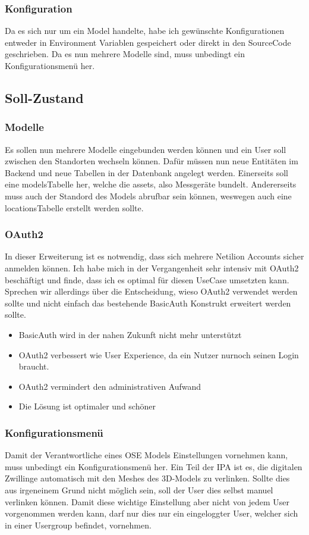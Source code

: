 \subsubsection{Konfiguration}
Da es sich nur um ein Model handelte, habe ich gewünschte Konfigurationen entweder in Environment Variablen gespeichert oder direkt in den SourceCode geschrieben. Da es nun mehrere Modelle sind, muss unbedingt ein Konfigurationsmenü her.
\subsection{Soll-Zustand} \label{soll-zustand}
\subsubsection{Modelle}
Es sollen nun mehrere Modelle eingebunden werden können und ein User soll zwischen den Standorten wechseln können. Dafür müssen nun neue Entitäten im Backend und neue Tabellen in der Datenbank angelegt werden. Einerseits soll eine \flqq models\frqq Tabelle her, welche die \flqq assets\frqq , also Messgeräte bundelt. Andererseits muss auch der Standord des Models abrufbar sein können, weswegen auch eine \flqq locations\frqq Tabelle erstellt werden sollte.
\subsubsection{OAuth2}
In dieser Erweiterung ist es notwendig, dass sich mehrere Netilion Accounts sicher anmelden können. Ich habe mich in der Vergangenheit sehr intensiv mit OAuth2 beschäftigt und finde, dass ich es optimal für diesen UseCase umsetzten kann. Sprechen wir allerdings über die Entscheidung, wieso OAuth2 verwendet werden sollte und nicht einfach das bestehende BasicAuth Konstrukt erweitert werden sollte.
\begin{itemize}
  \item BasicAuth wird in der nahen Zukunft nicht mehr unterstützt
  \item OAuth2 verbessert wie User Experience, da ein Nutzer nurnoch seinen Login braucht.
  \item OAuth2 vermindert den administrativen Aufwand
  \item Die Lösung ist optimaler und schöner
\end{itemize}
\subsubsection{Konfigurationsmenü}
Damit der Verantwortliche eines OSE Models Einstellungen vornehmen kann, muss unbedingt ein Konfigurationsmenü her. Ein Teil der IPA ist es, die digitalen Zwillinge automatisch mit den Meshes des 3D-Models zu verlinken. Sollte dies aus irgeneinem Grund nicht möglich sein, soll der User dies selbst manuel verlinken können. Damit diese wichtige Einstellung aber nicht von jedem User vorgenommen werden kann, darf nur dies nur ein eingeloggter User, welcher sich in einer Usergroup befindet, vornehmen.